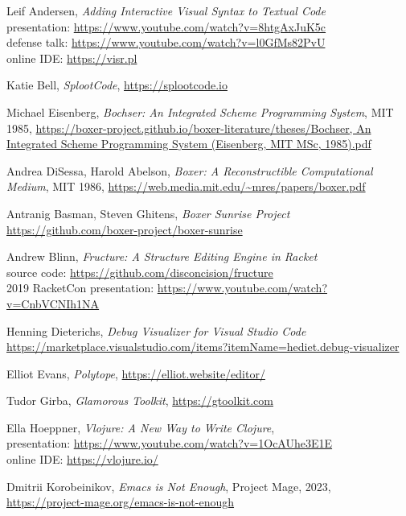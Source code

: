 \documentclass[sigconf]{acmart}
\begin{document}
\begin{thebibliography}{14}
  
  Leif Andersen, \emph{Adding Interactive Visual Syntax to Textual Code} \\
  presentation: \url{https://www.youtube.com/watch?v=8htgAxJuK5c} \\ 
  defense talk: \url{https://www.youtube.com/watch?v=l0GfMs82PvU} \\
  online IDE: \url{https://visr.pl}

  Katie Bell, \emph{SplootCode}, \url{https://splootcode.io}
  
  Michael Eisenberg, \emph{Bochser: An Integrated Scheme Programming System},
  MIT 1985, \url{https://boxer-project.github.io/boxer-literature/theses/Bochser, An Integrated Scheme Programming System (Eisenberg, MIT MSc, 1985).pdf}
  
  Andrea DiSessa, Harold Abelson,
  \emph{Boxer: A Reconstructible Computational Medium},
  MIT 1986, \url{https://web.media.mit.edu/~mres/papers/boxer.pdf}

  Antranig Basman, Steven Ghitens, \emph{Boxer Sunrise Project} \\
  \url{https://github.com/boxer-project/boxer-sunrise}
  
  Andrew Blinn, \emph{Fructure: A Structure Editing Engine in Racket} \\
  source code: \url{https://github.com/disconcision/fructure} \\
  2019 RacketCon presentation: \url{https://www.youtube.com/watch?v=CnbVCNIh1NA}

  Henning Dieterichs, \emph{Debug Visualizer for Visual Studio Code} \\
  \url{https://marketplace.visualstudio.com/items?itemName=hediet.debug-visualizer}
  
  Elliot Evans, \emph{Polytope}, \url{https://elliot.website/editor/}

  Tudor Girba, \emph{Glamorous Toolkit}, \url{https://gtoolkit.com}
  
  Ella Hoeppner, \emph{Vlojure: A New Way to Write Clojure}, \\
  presentation: \url{https://www.youtube.com/watch?v=1OcAUhe3E1E} \\
  online IDE: \url{https://vlojure.io/}
  
  Dmitrii Korobeinikov, \emph{Emacs is Not Enough}, Project Mage, 2023, 
  \url{https://project-mage.org/emacs-is-not-enough}
  

\end{thebibliography}
\end{document}

